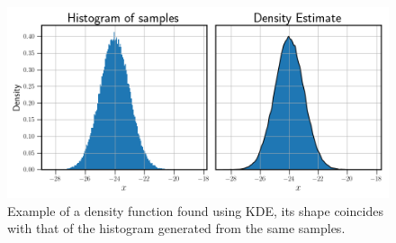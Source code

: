 \begin{figure}[hbt!]
    \centering
    \includegraphics[width=\textwidth]{../Figures/kde_example.png}
    \caption{Example of a density function found using KDE, its shape coincides with that
    of the histogram generated from the same samples.}
    \label{fig:kde example}
\end{figure}



